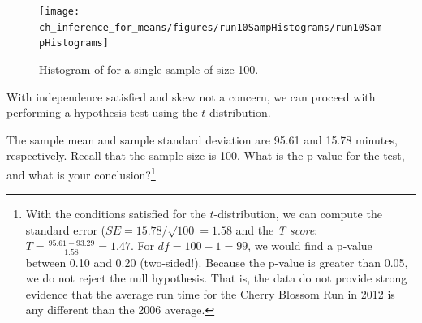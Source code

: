 \begin{figure}
\centering
\texttt{[image: ch\_inference\_for\_means/figures/run10SampHistograms/run10SampHistograms]} 
\caption{Histogram of  for a single sample of size 100.}
\label{run10SampHistogramsInHTForMeanSubsection}
\end{figure}

With independence satisfied and skew not a concern, we can proceed with performing a hypothesis test using the $t$-distribution.

\begin{exercise}
The sample mean and sample standard deviation are 95.61 and 15.78 minutes, respectively. Recall that the sample size is 100. What is the p-value for the test, and what is your conclusion?\footnote{With the conditions satisfied for the $t$-distribution, we can compute the standard error ($SE = 15.78 / \sqrt{100} = 1.58$ and the \emph{T score}: $T = \frac{95.61 - 93.29}{1.58} = 1.47$. For $df = 100 - 1 = 99$, we would find a p-value between 0.10 and 0.20 (two-sided!). Because the p-value is greater than 0.05, we do not reject the null hypothesis. That is, the data do not provide strong evidence that the average run time for the Cherry Blossom Run in 2012 is any different than the 2006 average.}
\end{exercise}

